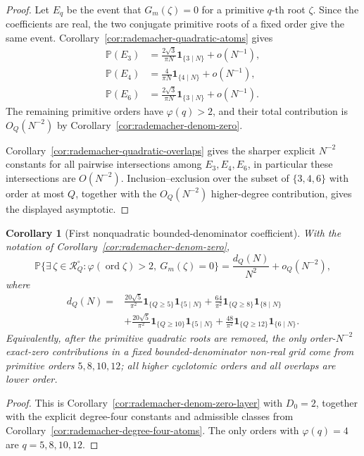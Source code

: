 \documentclass[11pt]{amsart}
\numberwithin{equation}{section}
\newtheorem{corollary}[theorem]{Corollary}
\theoremstyle{definition}
\theoremstyle{remark}
\newcommand{\Prob}{\mathbb P}
\begin{document}
\begin{proof}
Let \(E_q\) be the event that \(G_m(\zeta)=0\) for a primitive \(q\)-th root
\(\zeta\).  Since the coefficients are real, the two conjugate primitive roots
of a fixed order give the same event.  Corollary~\ref{cor:rademacher-quadratic-atoms}
gives
\[
\begin{aligned}
  \Prob(E_3)&=\frac{2\sqrt3}{\pi N}\mathbf1_{\{3\mid N\}}+o(N^{-1}),\\
  \Prob(E_4)&=\frac{4}{\pi N}\mathbf1_{\{4\mid N\}}+o(N^{-1}),\\
  \Prob(E_6)&=\frac{2\sqrt3}{\pi N}\mathbf1_{\{3\mid N\}}+o(N^{-1}).
\end{aligned}
\]
The remaining primitive orders have \(\varphi(q)>2\), and their total
contribution is \(O_Q(N^{-2})\) by Corollary~\ref{cor:rademacher-denom-zero}.

Corollary~\ref{cor:rademacher-quadratic-overlaps} gives the sharper explicit
\(N^{-2}\) constants for all pairwise intersections among \(E_3,E_4,E_6\), in
particular these intersections are \(O(N^{-2})\).  Inclusion--exclusion over
the subset of \(\{3,4,6\}\) with order at most \(Q\), together with the
\(O_Q(N^{-2})\) higher-degree contribution, gives the displayed asymptotic.
\end{proof}

\begin{corollary}[First nonquadratic bounded-denominator coefficient]
\label{cor:rademacher-denom-zero-degree-four-leading}
With the notation of Corollary~\ref{cor:rademacher-denom-zero},
\[
  \Prob\{\exists\,\zeta\in\mathcal R_Q^\circ:
     \varphi(\operatorname{ord}\zeta)>2,\ G_m(\zeta)=0\}
  =\frac{d_Q(N)}{N^2}+o_Q(N^{-2}),
\]
where
\[
\begin{aligned}
  d_Q(N)=&
  \frac{20\sqrt5}{\pi^2}\mathbf1_{\{Q\ge5\}}\mathbf1_{\{5\mid N\}}
  +\frac{64}{\pi^2}\mathbf1_{\{Q\ge8\}}\mathbf1_{\{8\mid N\}} \\
  &+\frac{20\sqrt5}{\pi^2}\mathbf1_{\{Q\ge10\}}\mathbf1_{\{5\mid N\}}
  +\frac{48}{\pi^2}\mathbf1_{\{Q\ge12\}}\mathbf1_{\{6\mid N\}} .
\end{aligned}
\]
Equivalently, after the primitive quadratic roots are removed, the only
order-\(N^{-2}\) exact-zero contributions in a fixed bounded-denominator
non-real grid come from primitive orders \(5,8,10,12\); all higher cyclotomic
orders and all overlaps are lower order.
\end{corollary}

\begin{proof}
This is Corollary~\ref{cor:rademacher-denom-zero-layer} with \(D_0=2\), together
with the explicit degree-four constants and admissible classes from
Corollary~\ref{cor:rademacher-degree-four-atoms}.  The only orders with
\(\varphi(q)=4\) are \(q=5,8,10,12\).
\end{proof}
\end{document}
